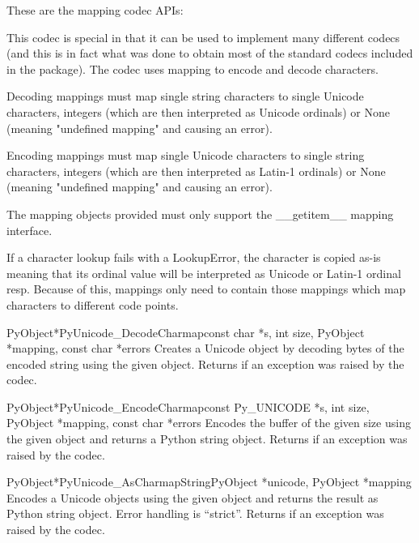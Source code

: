 These are the mapping codec APIs:

This codec is special in that it can be used to implement many
different codecs (and this is in fact what was done to obtain most of
the standard codecs included in the  package). The
codec uses mapping to encode and decode characters.

Decoding mappings must map single string characters to single Unicode
characters, integers (which are then interpreted as Unicode ordinals)
or None (meaning "undefined mapping" and causing an error).

Encoding mappings must map single Unicode characters to single string
characters, integers (which are then interpreted as Latin-1 ordinals)
or None (meaning "undefined mapping" and causing an error).

The mapping objects provided must only support the __getitem__ mapping
interface.

If a character lookup fails with a LookupError, the character is
copied as-is meaning that its ordinal value will be interpreted as
Unicode or Latin-1 ordinal resp. Because of this, mappings only need
to contain those mappings which map characters to different code
points.

\begin{cfuncdesc}{PyObject*}{PyUnicode_DecodeCharmap}{const char *s,
                                               int size,
                                               PyObject *mapping,
                                               const char *errors}
  Creates a Unicode object by decoding  bytes of the encoded
  string  using the given  object.  Returns
  \NULL{} if an exception was raised by the codec.
\end{cfuncdesc}

\begin{cfuncdesc}{PyObject*}{PyUnicode_EncodeCharmap}{const Py_UNICODE *s,
                                               int size,
                                               PyObject *mapping,
                                               const char *errors}
  Encodes the  buffer of the given size using the
  given  object and returns a Python string object.
  Returns \NULL{} if an exception was raised by the codec.
\end{cfuncdesc}

\begin{cfuncdesc}{PyObject*}{PyUnicode_AsCharmapString}{PyObject *unicode,
                                                        PyObject *mapping}
  Encodes a Unicode objects using the given  object and
  returns the result as Python string object.  Error handling is
  ``strict''.  Returns \NULL{} if an exception was raised by the
  codec.
\end{cfuncdesc}


